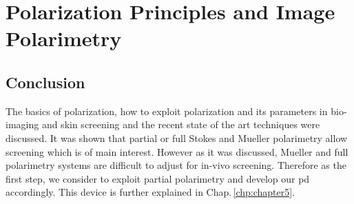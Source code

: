 \clearemptydoublepage
\acresetall
\chapter{Polarization Principles and Image Polarimetry}
\label{chp:chapter4}







\section{Conclusion}
The basics of polarization, how to exploit polarization and its parameters in bio-imaging and skin screening and the recent state of the art techniques were discussed. 
It was shown that partial or full Stokes and Mueller polarimetry allow screening which is of main interest. 
However as it was discussed, Mueller and full polarimetry systems are difficult to adjust for in-vivo screening. 
Therefore as the first step, we consider to exploit partial polarimetry and develop our \ac{pd} accordingly.
This device is further explained in Chap.\,\ref{chp:chapter5}.


